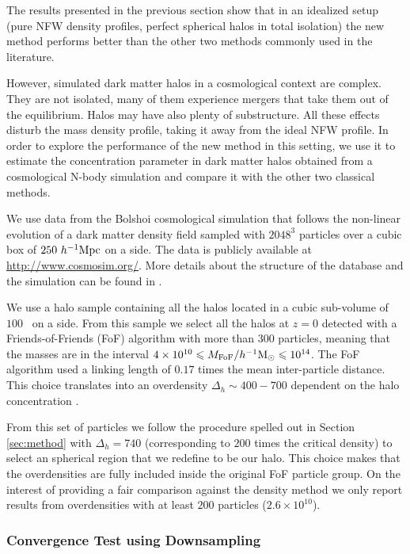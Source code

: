 \documentclass[a4,useAMS,usenatbib,usegraphicx]{mn2e}
\newcommand{\hMpc}{{\ifmmode{h^{-1}{\rm Mpc}}\else{$h^{-1}$Mpc}\fi}}
\newcommand{\hMsun}{{\ifmmode{h^{-1}{\rm {M_{\odot}}}}\else{$h^{-1}{\rm{M_{\odot}}}$}\fi}}
\begin{document}
The results presented in the previous section show that in an
idealized setup (pure NFW density profiles, perfect spherical halos in
total isolation) the new method performs better than the other two
methods commonly used in the literature.

However, simulated dark matter halos in a cosmological context are
complex. 
They are not isolated, many of them  experience mergers that take them
out of the equilibrium. 
Halos may have also plenty of substructure. 
All these effects disturb the mass density profile, taking it  away
from the ideal NFW profile. 
In order to explore the performance of the new method in this setting, we
use it to estimate the  concentration parameter in dark matter halos
obtained from a cosmological N-body simulation and compare it with the
other two classical methods.   
 
We use data from the Bolshoi cosmological simulation that follows
the non-linear evolution of a dark matter density field sampled with
$2048^3$ particles over a cubic box of $250\ \hMpc$ on a side.  
The data is publicly available at \url{http://www.cosmosim.org/}.
More details about the structure of the database and the simulation
can be found in \citep{2013AN....334..691R}.

We use a halo sample containing all the halos located in a cubic
sub-volume of $100$ \hMpc\ on a side.
From this sample we select all the halos at $z=0$ detected
with a Friends-of-Friends (FoF) algorithm with more than 300
particles, meaning that the masses are in the interval
$4\times 10^{10}\leq M_{\rm FoF}/\hMsun \leq 10^{14}$.  
The FoF algorithm used a linking length of $0.17$ times the mean
inter-particle distance. This choice translates into an overdensity
$\Delta_h\sim  400-700$ dependent on the halo concentration \citep{More2011}.

From this set of particles we follow the procedure spelled out in
Section \ref{sec:method} with $\Delta_h=740$ (corresponding to $200$
times the critical density) to select an spherical region that we
redefine to be our halo.  
This choice makes that the overdensities are fully included inside the
original FoF particle group.   
On the interest of providing a fair comparison against the density method we
only report results from overdensities with at least $200$ particles
($2.6\times 10^{10}$\hMsun). 

\subsubsection{Convergence Test using Downsampling}
\end{document}
